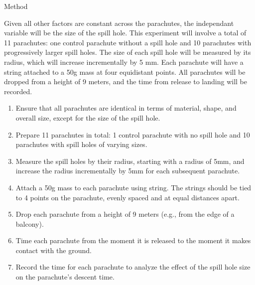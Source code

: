 \documentclass[final]{beamer}
\newlength{\colwidth}
\begin{document}
\begin{frame}[t]
\begin{columns}[t]
\begin{column}{\colwidth}
\begin{block}{Method}
\begin{itemize}
    \end{itemize}

Given all other factors are constant across the parachutes, the independant variable will be the size of the spill hole. This experiment will involve a total of 11 parachutes: one control parachute without a spill hole and 10 parachutes with progressively larger spill holes. The size of each spill hole will be measured by its radius, which will increase incrementally by 5 mm. Each parachute will have a string attached to a 50g mass at four equidistant points. All parachutes will be dropped from a height of 9 meters, and the time from release to landing will be recorded.

\begin{enumerate}
    \item Ensure that all parachutes are identical in terms of material, shape, and overall size, except for the size of the spill hole.
    
    \item Prepare 11 parachutes in total: 1 control parachute with no spill hole and 10 parachutes with spill holes of varying sizes.


    \item Measure the spill holes by their radius, starting with a radius of 5mm, and increase the radius incrementally by 5mm for each subsequent parachute.

    \item Attach a 50g mass to each parachute using string. The strings should be tied to 4 points on the parachute, evenly spaced and at equal distances apart.

    \item Drop each parachute from a height of 9 meters (e.g., from the edge of a balcony).
    
    \item Time each parachute from the moment it is released to the moment it makes contact with the ground.

    \item Record the time for each parachute to analyze the effect of the spill hole size on the parachute's descent time.
\end{enumerate}



\end{block}
\end{column}
\end{columns}
\end{frame}
\end{document}
